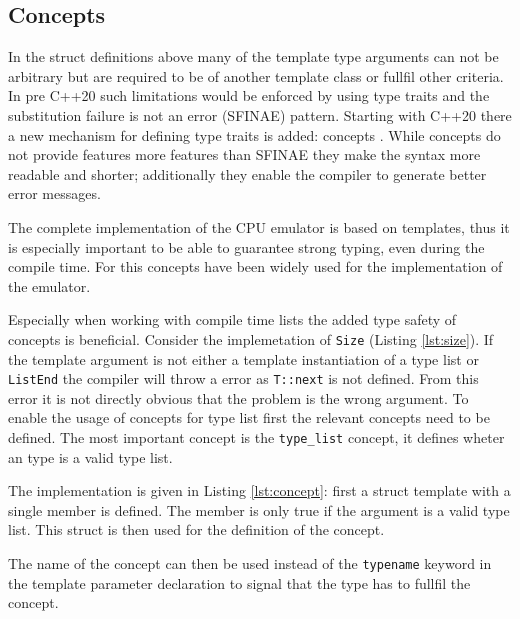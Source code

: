 



\subsection{Concepts}
In the struct definitions above many of the template type arguments can not be arbitrary
but are required to be of another template class or fullfil other criteria. In pre C++20
such limitations would be enforced by using type traits and the substitution failure is 
not an error (SFINAE) pattern.
Starting with C++20 there a new mechanism for defining type traits is added: concepts .
While concepts do not provide features more features than SFINAE
they make the syntax more readable and shorter; additionally they enable the compiler to
generate better error messages.

The complete implementation of the CPU emulator is based on templates, thus it is especially important to be able to guarantee strong typing, even during the compile time. For this
concepts have been widely used for the implementation of the emulator.

Especially when working with compile time lists the added type safety of concepts is
beneficial. Consider the implemetation of \lstinline{Size} (Listing \ref{lst:size}).
If the template argument is not either a template instantiation of a type list or 
\lstinline{ListEnd} the compiler will throw a error as \lstinline{T::next} is not
defined. From this error it is not directly obvious that the problem is the wrong
argument. To enable the usage of concepts for type list first the relevant concepts
need to be defined. The most important concept is the \lstinline{type_list} concept,
it defines wheter an type is a valid type list.

The implementation is given in Listing \ref{lst:concept}: first a struct template with
a single member is defined. The member is only true if the argument is a valid type list.
This struct is then used for the definition of the concept.



The name of the concept can then be used instead of the \lstinline{typename} keyword 
in the template parameter declaration to  signal that the type has to fullfil the concept. 

